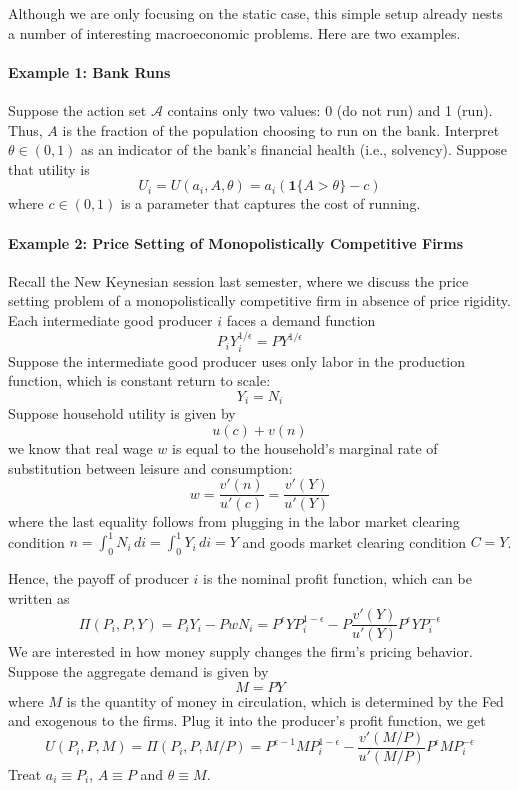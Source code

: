 \documentclass[12pt]{article}
\begin{document}
Although we are only focusing on the static case, this simple setup already nests a number of interesting macroeconomic problems. Here are two examples.

\paragraph{Example 1: Bank Runs \\ [6pt]} 
Suppose the action set $\mathcal{A}$ contains only two values: 0 (do not run) and 1 (run). Thus, $A$ is the fraction of the population choosing to run on the bank. Interpret $\theta \in (0,1)$ as an indicator of the bank's financial health (i.e., solvency). Suppose that utility is
\begin{equation}
	U_i = U(a_i, A, \theta) = a_i (\mathbf{1}\{A > \theta\} - c)
\end{equation}
where $c \in (0,1)$ is a parameter that captures the cost of running. 

\paragraph{Example 2: Price Setting of Monopolistically Competitive Firms \\ [6pt]}

Recall the New Keynesian session last semester, where we discuss the price setting problem of a monopolistically competitive firm in absence of price rigidity. Each intermediate good producer $i$ faces a demand function
\begin{equation}
	P_i Y_i^{1/\epsilon} = P Y^{1/\epsilon} 
\end{equation} 
Suppose the intermediate good producer uses only labor in the production function, which is constant return to scale:
\[Y_i = N_i\]
Suppose household utility is given by
\[u(c) + v(n)\]
we know that real wage $w$ is equal to the household's marginal rate of substitution between leisure and consumption:
\[w = \frac{v'(n)}{u'(c)} = \frac{v'(Y)}{u'(Y)}\]
where the last equality follows from plugging in the labor market clearing condition $n = \int_0^1 N_i \, di = \int_0^1 Y_i \, di = Y$ and goods market clearing condition $C = Y$.

Hence, the payoff of producer $i$ is the nominal profit function, which can be written as 
\begin{equation} \label{eq:profit_firm}
	\Pi(P_i, P, Y) =  P_i Y_i - P w N_i = P^\epsilon Y P_i^{1-\epsilon} - P \frac{v'(Y)}{u'(Y)} P^\epsilon Y P_i^{-\epsilon}
\end{equation}
We are interested in how money supply changes the firm's pricing behavior. Suppose the aggregate demand is given by 
\begin{equation}
	M = PY
\end{equation}
where $M$ is the quantity of money in circulation, which is determined by the Fed and exogenous to the firms. Plug it into the producer's profit function, we get
\begin{equation}
	U(P_i, P, M) = \Pi(P_i, P, M/P) = P^{\epsilon-1} M P_i^{1-\epsilon} - \frac{v'(M/P)}{u'(M/P)} P^\epsilon M P_i^{-\epsilon}
\end{equation}
Treat $a_i \equiv P_i$, $A \equiv P$ and $\theta \equiv M$. 
\end{document}
